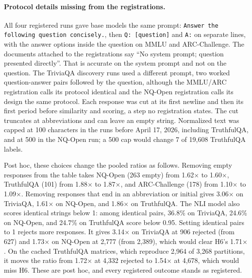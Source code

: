 \paragraph{Protocol details missing from the registrations.} All four registered runs gave base models the same prompt: \texttt{Answer the following question concisely.}, then \texttt{Q: [question]} and \texttt{A:} on separate lines, with the answer options inside the question on MMLU and ARC-Challenge. The documents attached to the registrations say ``No system prompt; question presented directly''. That is accurate on the system prompt and not on the question. The TriviaQA discovery runs used a different prompt, two worked question-answer pairs followed by the question, although the MMLU/ARC registration calls its protocol identical and the NQ-Open registration calls its design the same protocol. Each response was cut at its first newline and then its first period before similarity and scoring, a step no registration states. The cut truncates at abbreviations and can leave an empty string. Normalized text was capped at 100 characters in the runs before April 17, 2026, including TruthfulQA, and at 500 in the NQ-Open run; a 500 cap would change 7 of 19,608 TruthfulQA labels.

Post hoc, these choices change the pooled ratios as follows. Removing empty responses from the table takes NQ-Open (263 empty) from 1.62$\times$ to 1.60$\times$, TruthfulQA (101) from 1.88$\times$ to 1.87$\times$, and ARC-Challenge (178) from 1.10$\times$ to 1.09$\times$. Removing responses that end in an abbreviation or initial gives 3.06$\times$ on TriviaQA, 1.61$\times$ on NQ-Open, and 1.86$\times$ on TruthfulQA. The NLI model also scores identical strings below 1: among identical pairs, 36.8\% on TriviaQA, 24.6\% on NQ-Open, and 24.7\% on TruthfulQA score below 0.95. Setting identical pairs to 1 rejects more responses. It gives 3.14$\times$ on TriviaQA at 906 rejected (from 627) and 1.73$\times$ on NQ-Open at 2,777 (from 2,389), which would clear H6's 1.71$\times$. On the cached TruthfulQA matrices, which reproduce 2,964 of 3,268 partitions, it moves the ratio from 1.72$\times$ at 4,332 rejected to 1.54$\times$ at 4,678, which would miss H6. These are post hoc, and every registered outcome stands as registered.

